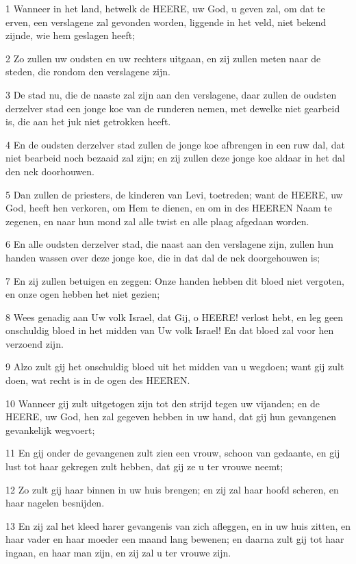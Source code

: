 \par 1 Wanneer in het land, hetwelk de HEERE, uw God, u geven zal, om dat te erven, een verslagene zal gevonden worden, liggende in het veld, niet bekend zijnde, wie hem geslagen heeft;
\par 2 Zo zullen uw oudsten en uw rechters uitgaan, en zij zullen meten naar de steden, die rondom den verslagene zijn.
\par 3 De stad nu, die de naaste zal zijn aan den verslagene, daar zullen de oudsten derzelver stad een jonge koe van de runderen nemen, met dewelke niet gearbeid is, die aan het juk niet getrokken heeft.
\par 4 En de oudsten derzelver stad zullen de jonge koe afbrengen in een ruw dal, dat niet bearbeid noch bezaaid zal zijn; en zij zullen deze jonge koe aldaar in het dal den nek doorhouwen.
\par 5 Dan zullen de priesters, de kinderen van Levi, toetreden; want de HEERE, uw God, heeft hen verkoren, om Hem te dienen, en om in des HEEREN Naam te zegenen, en naar hun mond zal alle twist en alle plaag afgedaan worden.
\par 6 En alle oudsten derzelver stad, die naast aan den verslagene zijn, zullen hun handen wassen over deze jonge koe, die in dat dal de nek doorgehouwen is;
\par 7 En zij zullen betuigen en zeggen: Onze handen hebben dit bloed niet vergoten, en onze ogen hebben het niet gezien;
\par 8 Wees genadig aan Uw volk Israel, dat Gij, o HEERE! verlost hebt, en leg geen onschuldig bloed in het midden van Uw volk Israel! En dat bloed zal voor hen verzoend zijn.
\par 9 Alzo zult gij het onschuldig bloed uit het midden van u wegdoen; want gij zult doen, wat recht is in de ogen des HEEREN.
\par 10 Wanneer gij zult uitgetogen zijn tot den strijd tegen uw vijanden; en de HEERE, uw God, hen zal gegeven hebben in uw hand, dat gij hun gevangenen gevankelijk wegvoert;
\par 11 En gij onder de gevangenen zult zien een vrouw, schoon van gedaante, en gij lust tot haar gekregen zult hebben, dat gij ze u ter vrouwe neemt;
\par 12 Zo zult gij haar binnen in uw huis brengen; en zij zal haar hoofd scheren, en haar nagelen besnijden.
\par 13 En zij zal het kleed harer gevangenis van zich afleggen, en in uw huis zitten, en haar vader en haar moeder een maand lang bewenen; en daarna zult gij tot haar ingaan, en haar man zijn, en zij zal u ter vrouwe zijn.
